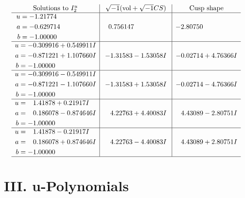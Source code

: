 \documentclass[1p]{elsarticle_modified}
\theoremstyle{definition}
\newcommand{\I}{\sqrt{-1}}
\begin{document}
$$\begin{array}{c|c|c}  
\text{Solutions to }I^u_{2}& \I (\text{vol} + \sqrt{-1}CS) & \text{Cusp shape}\\
 \hline 
\begin{aligned}
u &= -1.21774\phantom{ +0.000000I} \\
a &= -0.629714\phantom{ +0.000000I} \\
b &= -1.00000\phantom{ +0.000000I}\end{aligned}
 & \phantom{-}0.756147\phantom{ +0.000000I} & -2.80750\phantom{ +0.000000I} \\ \hline\begin{aligned}
u &= -0.309916 + 0.549911 I \\
a &= -0.871221 + 1.107660 I \\
b &= -1.00000\phantom{ +0.000000I}\end{aligned}
 & -1.31583 - 1.53058 I & -0.02714 + 4.76366 I \\ \hline\begin{aligned}
u &= -0.309916 - 0.549911 I \\
a &= -0.871221 - 1.107660 I \\
b &= -1.00000\phantom{ +0.000000I}\end{aligned}
 & -1.31583 + 1.53058 I & -0.02714 - 4.76366 I \\ \hline\begin{aligned}
u &= \phantom{-}1.41878 + 0.21917 I \\
a &= \phantom{-}0.186078 - 0.874646 I \\
b &= -1.00000\phantom{ +0.000000I}\end{aligned}
 & \phantom{-}4.22763 + 4.40083 I & \phantom{-}4.43089 - 2.80751 I \\ \hline\begin{aligned}
u &= \phantom{-}1.41878 - 0.21917 I \\
a &= \phantom{-}0.186078 + 0.874646 I \\
b &= -1.00000\phantom{ +0.000000I}\end{aligned}
 & \phantom{-}4.22763 - 4.40083 I & \phantom{-}4.43089 + 2.80751 I\\
 \hline 
 \end{array}$$\newpage
\newpage\renewcommand{\arraystretch}{1}
\centering \section*{ III. u-Polynomials}
\end{document}
